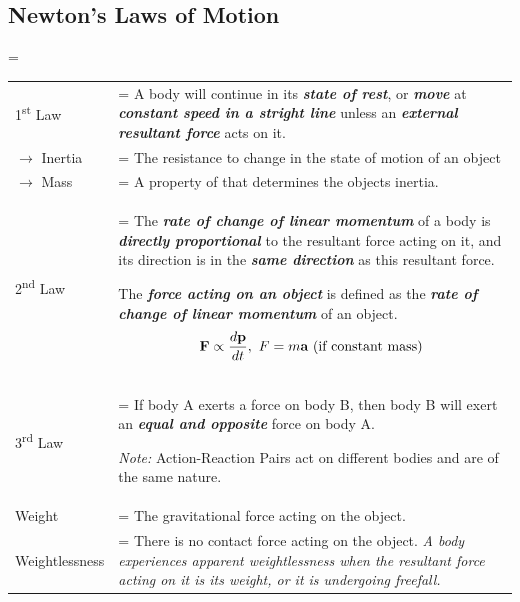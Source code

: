 \documentclass[a4paper,11pt]{article}
\newlength{\oldparskip}
\begin{document}
		\subsection{Newton's Laws of Motion}
			\oldparskip=\parskip
			\begin{center}
				\renewcommand{\arraystretch}{1.2}
				\begin{tabular}{@{} l >{\parskip=\oldparskip}p{11.5cm} @{}}
					\toprule
					1\textsuperscript{st} Law & A body will continue in its \textit{\textbf{state of rest}}, or \textbf{\textit{move}} at \textbf{\textit{constant speed in a stright line}} unless an \textbf{\textit{external resultant force}} acts on it.\\
					$\rightarrow$ Inertia & The resistance to change in the state of motion of an object \\
					$\rightarrow$ Mass & A property of that determines the objects inertia. \\
					\midrule
					2\textsuperscript{nd} Law & The \textbf{\textit{rate of change of linear momentum}} of a body is \textbf{\textit{directly proportional}} to the resultant force acting on it, and its direction is in the \textbf{\textit{same direction}} as this resultant force. \par The \textbf{\textit{force acting on an object}} is defined as the \textbf{\textit{rate of change of linear momentum}} of an object. $$\textbf{F} \propto \frac{d\textbf{p}}{dt}, ~F=m\textbf{a} \textrm{ (if constant mass)} \vspace*{-\baselineskip}$$ \\
					\midrule
					3\textsuperscript{rd} Law & If body A exerts a force on body B, then body B will exert an \textbf{\textit{equal and opposite}} force on body A. \par \textit{Note:} Action-Reaction Pairs act on different bodies and are of the same nature.\\
					\midrule
					Weight & The gravitational force acting on the object. \\
					Weightlessness & There is no contact force acting on the object. \textit{A body experiences apparent weightlessness when the resultant force acting on it is its weight, or it is undergoing freefall.} \\
					\bottomrule
				\end{tabular}
			\end{center}
\end{document}
